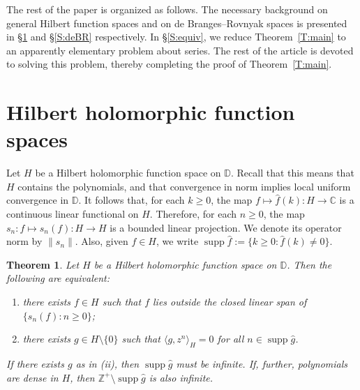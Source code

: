 \documentclass[11pt,reqno]{amsart}
\theoremstyle{plain}
\newtheorem{theorem}{Theorem}[section]
\theoremstyle{definition}
\theoremstyle{remark}
\newcommand{\CC}{\mathbb{C}}
\newcommand{\DD}{\mathbb{D}}
\newcommand{\ZZ}{\mathbb{Z}}
\renewcommand{\hat}{\widehat}
\DeclareMathOperator{\supp}{supp}
\begin{document}
The rest of the paper is organized as follows.
The necessary  background on general Hilbert function spaces
and on de Branges--Rovnyak spaces
is presented in \S\ref{S:Hilbert} 
and  \S\ref{S:deBR} respectively.
In \S\ref{S:equiv}, we reduce Theorem~\ref{T:main} 
 to an apparently elementary problem about series.
The rest of the article is devoted to  solving 
this problem, thereby completing the proof of Theorem~\ref{T:main}.




\section{Hilbert holomorphic function spaces}\label{S:Hilbert}

Let $H$ be a Hilbert holomorphic function space on $\DD$. 
Recall that this means that $H$ contains the polynomials, and that
convergence in norm implies local uniform convergence in $\DD$.
It follows that, for each $k\ge0$, the map $f\mapsto \hat{f}(k):H\to\CC$ is a
continuous linear functional on $H$.
Therefore, for each $n\ge0$, the map 
$s_n:f\mapsto s_n(f):H\to H$ is a bounded linear projection. 
We denote its operator norm by $\|s_n\|$.
Also, given $f\in H$, we write $\supp\hat{f}:=\{k\ge0:\hat{f}(k)\ne0\}$.


\begin{theorem}\label{T:Hilbert}
Let $H$ be a Hilbert holomorphic function space on $\DD$.
Then the following are equivalent:
\begin{enumerate}[\normalfont(i)]
\item there exists $f\in H$ such that $f$ lies outside the closed linear span of $\{s_n(f):n\ge0\}$;
\item there exists $g\in H\setminus\{0\}$  such that  $\langle g,z^n\rangle_H=0$ for all $n\in\supp\hat{g}$.
\end{enumerate}
If there exists $g$ as in (ii), then $\supp\hat{g}$ must be infinite.
If, further, polynomials are dense in $H$, then $\ZZ^+\setminus \supp\hat{g}$ is also infinite.
\end{theorem}
\end{document}
